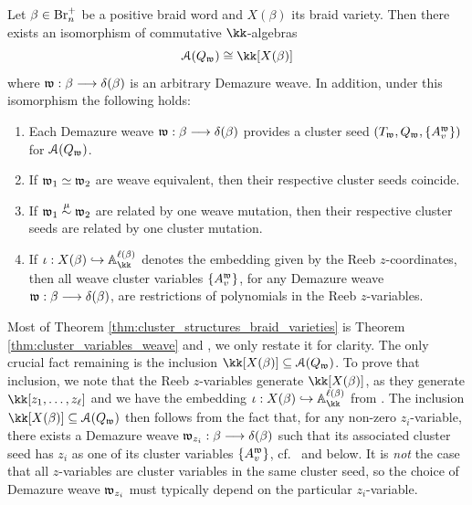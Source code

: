 \begin{fthm}\label{thm:cluster_structures_braid_varieties} Let $\beta\in\mbox{Br}_n^+$ be a positive braid word and $X(\beta)$ its braid variety. Then there exists an isomorphism of commutative $\kk$-algebras
\begin{equation}\label{eq:cluster_algebra_braid_variety}
\SA(Q_\w)\cong \kk[X(\beta)]
\end{equation}
where $\mathfrak{w}:\beta\longrightarrow\delta(\beta)$ is an arbitrary Demazure weave. In addition, under this isomorphism the following holds:
\begin{enumerate}
    \item Each Demazure weave $\mathfrak{w}:\beta\longrightarrow\delta(\beta)$ provides a cluster seed $(T_{\mathfrak{w}},Q_{\mathfrak{w}},\{A^{\mathfrak{w}}_v\})$ for $\mathcal{A}(Q_{\mathfrak{w}})$.\\
    \item If $\mathfrak{w}_1\simeq\mathfrak{w}_2$ are weave equivalent, then their respective cluster seeds coincide.\\
    \item If $\mathfrak{w}_1\stackrel{\mu}{\sim}\mathfrak{w}_2$ are related by one weave mutation, then their respective cluster seeds are related by one cluster mutation.\\
    \item If $\iota:X(\beta)\hookrightarrow \mathbb{A}_\kk^{\ell(\beta)}$ denotes the embedding given by the Reeb $z$-coordinates, then all weave cluster variables $\{A^{\mathfrak{w}}_v\}$, for any Demazure weave $\mathfrak{w}:\beta\longrightarrow\delta(\beta)$, are restrictions of polynomials in the Reeb $z$-variables.
\end{enumerate}
\end{fthm}
\vspace{0.2cm}
\noindent Most of Theorem \ref{thm:cluster_structures_braid_varieties} is Theorem \ref{thm:cluster_variables_weave} and , we only restate it for clarity. The only crucial fact remaining is the inclusion $\kk[X(\beta)]\sse \SA(Q_\w)$. To prove that inclusion, we note that the Reeb $z$-variables generate $\kk[X(\beta)]$, as they generate $\kk[z_1,\ldots,z_{\ell}]$ and we have the embedding $\iota:X(\beta)\hookrightarrow\mathbb{A}_\kk^{\ell(\beta)}$ from . The inclusion $\kk[X(\beta)]\sse \SA(Q_\w)$ then follows from the fact that, for any non-zero $z_i$-variable, there exists a Demazure weave $\mathfrak{w}_{z_i}:\beta\longrightarrow\delta(\beta)$ such that its associated cluster seed has $z_i$ as one of its cluster variables $\{A_v^{\mathfrak{w}}\}$, cf.~\cite[Section 4.3]{CGGLSS25} and  below. It is {\it not} the case that all $z$-variables are cluster variables in the same cluster seed, so the choice of Demazure weave $\mathfrak{w}_{z_i}$ must typically depend on the particular $z_i$-variable.

